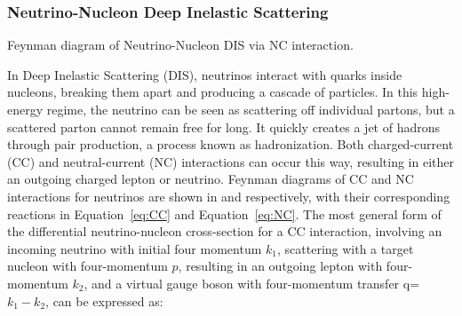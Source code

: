 \subsubsection*{Neutrino-Nucleon Deep Inelastic Scattering}
\label{sec:DIS}

\begin{marginfigure}
\centering
{}
\caption[Feynman diagram of Neutrino-Nucleon DIS via NC interaction]{Feynman diagram of Neutrino-Nucleon DIS via NC interaction.}
\end{marginfigure}
In Deep Inelastic Scattering (DIS), neutrinos interact with quarks inside nucleons, breaking them apart and producing a cascade of particles. In this high-energy regime, the neutrino can be seen as scattering off individual partons, but a scattered parton cannot remain free for long. It quickly creates a jet of hadrons through pair production, a process known as hadronization. Both charged-current (CC) and neutral-current (NC) interactions can occur this way, resulting in either an outgoing charged lepton or neutrino. Feynman diagrams of CC and NC interactions for neutrinos are shown in  and  respectively, with their corresponding reactions in Equation~\ref{eq:CC} and Equation~\ref{eq:NC}. The most general form of the differential neutrino-nucleon cross-section for a CC interaction, involving an incoming neutrino with initial four momentum $k_1$, scattering with a target nucleon with four-momentum $p$, resulting in an outgoing lepton with four-momentum $k_2$, and a virtual gauge boson with four-momentum transfer q=$k_1-k_2$, can be expressed as:

